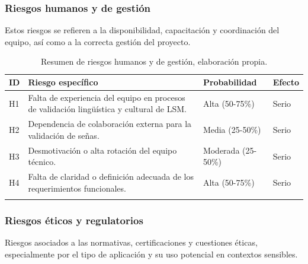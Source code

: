 \subsubsection{Riesgos humanos y de gestión}
Estos riesgos se refieren a la disponibilidad, capacitación y coordinación del equipo, así como a la correcta gestión del proyecto.

\setlength{\tabcolsep}{4pt}
\renewcommand{\arraystretch}{1.2}

\begin{longtable}{|>{\centering\arraybackslash}p{0.8cm}|>{\raggedright\arraybackslash}p{3.5cm}|>{\raggedright\arraybackslash}p{5.1cm}|>{\raggedright\arraybackslash}p{5.1cm}|}
	\hline
	\textbf{ID} & \textbf{Riesgo específico} & \textbf{Probabilidad} & \textbf{Efecto} \\
	\hline
	H1 & Falta de experiencia del equipo en procesos de validación lingüística y cultural de LSM. & Alta (50-75\%) & Serio \\
	\hline
	H2 & Dependencia de colaboración externa para la validación de señas. & Media (25-50\%) & Serio \\
	\hline
	H3 & Desmotivación o alta rotación del equipo técnico. & Moderada (25-50\%) & Serio \\
	\hline
	H4 & Falta de claridad o definición adecuada de los requerimientos funcionales. & Alta (50-75\%) & Serio \\
	\hline
\caption[Resumen de riesgos humanos y de gestión]{Resumen de riesgos humanos y de gestión, elaboración propia.} \label{tab:riesgos_humanoss_resumen} \\
\end{longtable}

\subsubsection{Riesgos éticos y regulatorios}
Riesgos asociados a las normativas, certificaciones y cuestiones éticas, especialmente por el tipo de aplicación y su uso potencial en contextos sensibles.

\setlength{\tabcolsep}{4pt}
\renewcommand{\arraystretch}{1.2}


